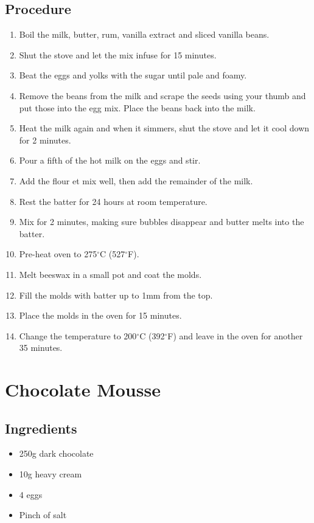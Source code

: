 \documentclass[10pt]{book}
\newcommand{\degree}{$^\circ$}
\begin{document}
\subsection*{Procedure}
	\begin{enumerate}
		\item Boil the milk, butter, rum, vanilla extract and sliced vanilla beans.
		\item Shut the stove and let the mix infuse for 15 minutes.
		\item Beat the eggs and yolks with the sugar until pale and foamy.
		\item Remove the beans from the milk and scrape the seeds using your thumb and put those into the egg mix. Place the beans back into the milk.
		\item Heat the milk again and when it simmers, shut the stove and let it cool down for 2 minutes.
		\item Pour a fifth of the hot milk on the eggs and stir.
		\item Add the flour et mix well, then add the remainder of the milk.
		\item Rest the batter for 24 hours at room temperature.
		\item Mix for 2 minutes, making sure bubbles disappear and butter melts into the batter.
		\item Pre-heat oven to 275{\degree}C (527{\degree}F).
		\item Melt beeswax in a small pot and coat the molds.
		\item Fill the molds with batter up to 1mm from the top.
		\item Place the molds in the oven for 15 minutes.
		\item Change the temperature to 200{\degree}C (392{\degree}F) and leave in the oven for another 35 minutes.
	\end{enumerate}
\newpage


\newpage
\section*{Chocolate Mousse}
\subsection*{Ingredients}
	\begin{itemize}
		\item 250g dark chocolate
		\item 10g heavy cream
		\item 4 eggs
		\item Pinch of salt
	\end{itemize}
\end{document}
